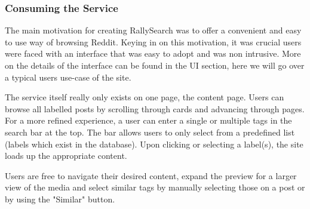 \documentclass[msc,oneside]{ubcthesis}%
\begin{document}
\subsubsection{Consuming the Service}
The main motivation for creating RallySearch was to offer a convenient and easy to use way of browsing Reddit. Keying in on this motivation, it was crucial users were faced with an interface that was easy to adopt and was non intrusive. More on the details of the interface can be found in the UI section, here we will go over a typical users use-case of the site.
\par
The service itself really only exists on one page, the content page. Users can browse all labelled posts by scrolling through cards and advancing through pages. For a more refined experience, a user can enter a single or multiple tags in the search bar at the top. The bar allows users to only select from a predefined list (labels which exist in the database). Upon clicking or selecting a label(s), the site loads up the appropriate content.
\par
Users are free to navigate their desired content, expand the preview for a larger view of the media and select similar tags by manually selecting those on a post or by using the "Similar" button.
\end{document}
